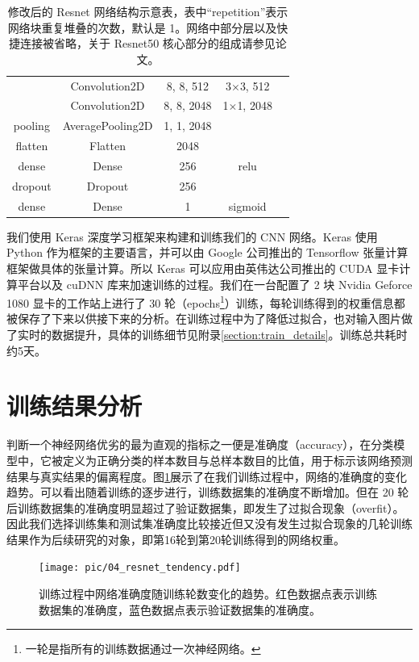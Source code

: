\begin{table}
\begin{tabular}{ccccc}
   & Convolution2D & 8, 8, 512 & 3$\times$3, 512 & \\
   & Convolution2D & 8, 8, 2048 & 1$\times$1, 2048 & \\ \hline
  pooling & AveragePooling2D & 1, 1, 2048 &  & \\ \hline
  flatten & Flatten & 2048 &  & \\ \hline
  dense & Dense & 256 & relu & \\  \hline
  dropout & Dropout & 256 &  & \\   \hline
  dense & Dense & 1 & sigmoid & \\ \hline \hline
    \end{tabular}
    \caption{修改后的 Resnet 网络结构示意表，表中“repetition”表示网络块重复堆叠的次数，默认是 1。网络中部分层以及快捷连接被省略，关于 Resnet50 核心部分的组成请参见论文\cite{he2016deep}。}
    \label{tab:resnet}
  \end{table}

我们使用 Keras\supercite{keras} 深度学习框架来构建和训练我们的 CNN 网络。Keras 使用 Python 作为框架的主要语言，并可以由 Google 公司推出的 Tensorflow\supercite{tensorflow} 张量计算框架做具体的张量计算。所以 Keras 可以应用由英伟达公司推出的 CUDA 显卡计算平台以及 cuDNN\supercite{cudnn} 库来加速训练的过程。我们在一台配置了 2 块 Nvidia Geforce 1080 显卡的工作站上进行了 30 轮（epochs\footnote{一轮是指所有的训练数据通过一次神经网络。}）训练，每轮训练得到的权重信息都被保存了下来以供接下来的分析。在训练过程中为了降低过拟合，也对输入图片做了实时的数据提升，具体的训练细节见附录\ref{section:train_details}。训练总共耗时约5天。
  
\section{训练结果分析}
\label{section:cnn_result}

判断一个神经网络优劣的最为直观的指标之一便是准确度（accuracy），在分类模型中，它被定义为正确分类的样本数目与总样本数目的比值，用于标示该网络预测结果与真实结果的偏离程度。图\ref{fig:train_par}展示了在我们训练过程中，网络的准确度的变化趋势。可以看出随着训练的逐步进行，训练数据集的准确度不断增加。但在 20 轮后训练数据集的准确度明显超过了验证数据集，即发生了过拟合现象（overfit）。因此我们选择训练集和测试集准确度比较接近但又没有发生过拟合现象的几轮训练结果作为后续研究的对象，即第16轮到第20轮训练得到的网络权重。

\begin{figure}
    \centering
    \texttt{[image: pic/04\_resnet\_tendency.pdf]}
    \caption{训练过程中网络准确度随训练轮数变化的趋势。红色数据点表示训练数据集的准确度，蓝色数据点表示验证数据集的准确度。}
    \label{fig:train_par}
\end{figure}

